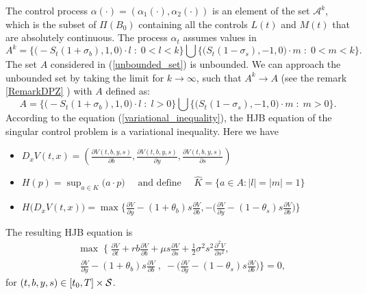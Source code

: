 The control process $\alpha(\cdot) = (\alpha_1(\cdot), \alpha_2(\cdot))$ is an element of the set $\mathcal{A}^k$,
which is the subset of $\Pi(B_0)$ containing all the controls $L(t)$ and $M(t)$ that are absolutely continuous. 
The process $\alpha_t$ assumes values in 
\begin{equation}
A^k = \biggl\{ \bigl(-S_{t}(1+\sigma_b),1,0) \cdot l \; : \; 0<l<k \biggr\} \bigcup \biggl\{ \bigl(S_{t}(1-\sigma_s),-1,0\bigr)\cdot m \; : \; 0<m<k \biggr\}.  
\end{equation}
The set $A$ considered in (\ref{unbounded_set}) is unbounded. We can approach the unbounded set by taking the limit for $k\to \infty$, such that    
$A^k \to A$ (see the remark \ref{RemarkDPZ} ) with $A$ defined as:
\begin{equation}
A = \biggl\{ \bigl(-S_{t}(1+\sigma_b),1,0) \cdot l \; : \; l>0 \biggr\} \bigcup \biggl\{ \bigl(S_{t}(1-\sigma_s),-1,0\bigr)\cdot m \; : \; m>0 \biggr\}. 
\end{equation}
According to the equation (\ref{variational_inequality}), the HJB equation of the singular control problem is a variational inequality. Here we have
\begin{itemize}
 \item $ D_x V(t,x) = \left( \frac{\partial V(t,b,y,s)}{\partial b}, \frac{\partial V(t,b,y,s)}{\partial y}, \frac{\partial V(t,b,y,s)}{\partial s} \right) $
 \item $H(p) = \sup_{a \in \hat K} \bigl( a\cdot p \bigr) \quad \mbox{ and define } \quad \hat K = \{ a \in A: |l|=|m|=1 \}$
 \item $H \bigl( D_x V(t,x) \bigr) = \max \biggl\{ \frac{\partial V}{\partial y}-(1+\theta_b) s \frac{\partial V}{\partial b} ,
 -\bigl( \frac{\partial V}{\partial y} -(1-\theta_s)s \frac{\partial V}{\partial b} \bigr) \biggr\} $
\end{itemize}
The resulting HJB equation is
\begin{align}\label{DPZ_HJB}
& \max \; \biggl\{ \; \frac{\partial V}{\partial t} + rb\frac{\partial V}{\partial b} 
+ \mu s \frac{\partial V}{\partial s} + \frac{1}{2}\sigma^2 s^2 \frac{\partial^2 V}{\partial s^2}, \\ \nonumber
& \;  \frac{\partial V}{\partial y}-(1+\theta_b) s \frac{\partial V}{\partial b} \; 
, \; -\biggl(\frac{\partial V}{\partial y}-(1-\theta_s)s \frac{\partial V}{\partial b} \biggr) \biggr\} = 0, 
\end{align}
for $(t,b,y,s) \in [t_0,T] \times \mathcal{S}$.

